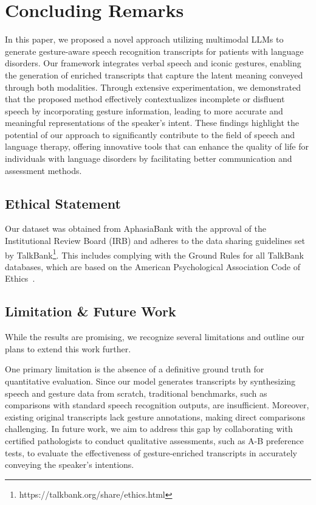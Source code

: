 \section{Concluding Remarks}
In this paper, we proposed a novel approach utilizing multimodal LLMs to generate gesture-aware speech recognition transcripts for patients with language disorders. Our framework integrates verbal speech and iconic gestures, enabling the generation of enriched transcripts that capture the latent meaning conveyed through both modalities. Through extensive experimentation, we demonstrated that the proposed method effectively contextualizes incomplete or disfluent speech by incorporating gesture information, leading to more accurate and meaningful representations of the speaker's intent. These findings highlight the potential of our approach to significantly contribute to the field of speech and language therapy, offering innovative tools that can enhance the quality of life for individuals with language disorders by facilitating better communication and assessment methods.

\subsection{Ethical Statement} 
Our dataset was obtained from AphasiaBank with the approval of the Institutional Review Board (IRB) and adheres to the data sharing guidelines set by TalkBank\footnote{https://talkbank.org/share/ethics.html}. This includes complying with the Ground Rules for all TalkBank databases, which are based on the American Psychological Association Code of Ethics~\cite{american2002ethical}.

\subsection{Limitation \& Future Work} 
While the results are promising, we recognize several limitations and outline our plans to extend this work further.

One primary limitation is the absence of a definitive ground truth for quantitative evaluation. Since our model generates transcripts by synthesizing speech and gesture data from scratch, traditional benchmarks, such as comparisons with standard speech recognition outputs, are insufficient. Moreover, existing original transcripts lack gesture annotations, making direct comparisons challenging. In future work, we aim to address this gap by collaborating with certified pathologists to conduct qualitative assessments, such as A-B preference tests, to evaluate the effectiveness of gesture-enriched transcripts in accurately conveying the speaker's intentions.

